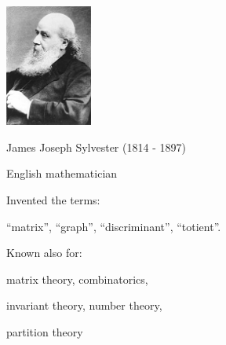 \begin{frame}
	\hfil\hfil \includegraphics[height=4cm]{../../modules/history/pictures/sylvester.jpg}
	
	\hfil\hfil James Joseph Sylvester (1814 - 1897)
	
	\hfil\hfil English mathematician
	
	\hfil\hfil Invented the terms: 
	
	\hfil\hfil ``matrix'', ``graph'', ``discriminant'', ``totient''.

	\hfil\hfil Known also for: 	
	
	\hfil\hfil matrix theory, combinatorics, 
	
	\hfil\hfil invariant theory, number theory, 
	
	\hfil\hfil partition theory
	
	
\end{frame}